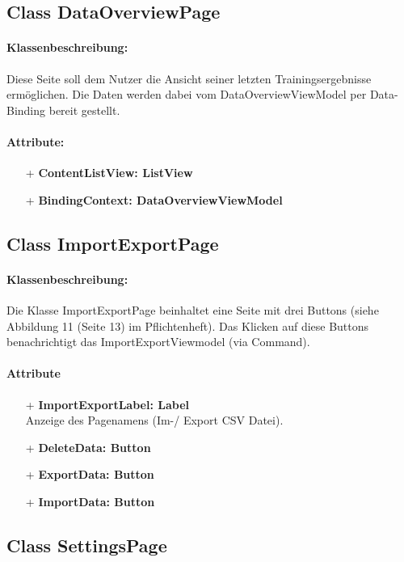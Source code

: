 \documentclass[a4paper,12pt]{article}
\begin{document}
	\subsection{Class DataOverviewPage}
		\paragraph{Klassenbeschreibung:}
		Diese Seite soll dem Nutzer die Ansicht seiner letzten Trainingsergebnisse ermöglichen.
		Die Daten werden dabei vom DataOverviewViewModel per Data-Binding bereit gestellt.
		\paragraph{Attribute:}
		\begin{itemize}
			\item[+] \textbf{ContentListView: ListView}
			\item[+] \textbf{BindingContext: DataOverviewViewModel} 
		\end{itemize}

	\subsection{Class ImportExportPage}
		\paragraph{Klassenbeschreibung:}
		Die Klasse ImportExportPage beinhaltet eine Seite mit drei Buttons (siehe Abbildung 11 (Seite 13) im Pflichtenheft).
		Das Klicken auf diese Buttons benachrichtigt das ImportExportViewmodel (via Command).
		\paragraph{Attribute}
		\begin{itemize}
			\item[+] \textbf{ImportExportLabel: Label} \\ Anzeige des Pagenamens (Im-/ Export CSV Datei).
			\item [+]\textbf{DeleteData: Button}
			\item [+]\textbf{ExportData: Button}
			\item [+]\textbf{ImportData: Button} %
		\end{itemize}

	\subsection{Class SettingsPage}
\end{document}
